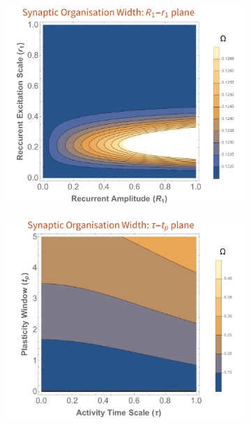 \begin{figure}[h!]
\begin{subfigure}{0.45\textwidth}
		\centering
		\includegraphics[width=\textwidth]{images/nft_activity/width_R1r1}
		\caption{}
	\end{subfigure}
	\begin{subfigure}{0.45\textwidth}
		\centering
		\includegraphics[width=\textwidth]{images/nft_activity/width_tautp}
		\caption{}
	\end{subfigure}
	\def\c{The variation in width ($\Omega$) in four distinct planar slices of the manifold of parameters which influence the models prediction of mean distribution width. }

\end{figure}
